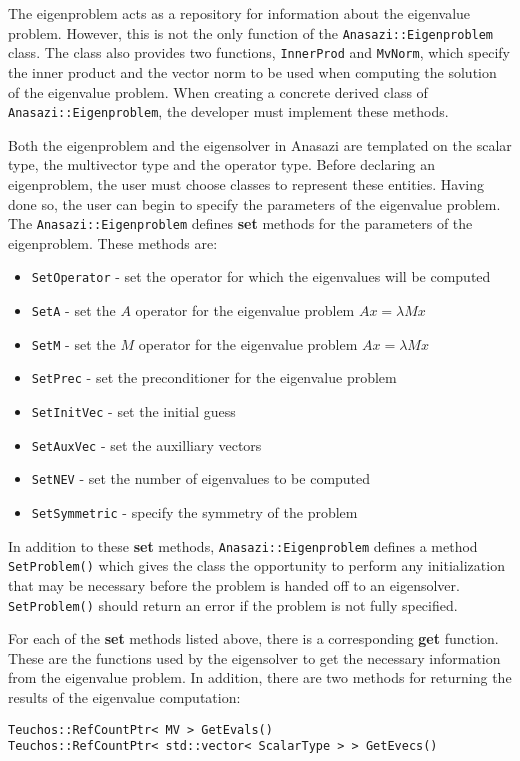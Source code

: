 The eigenproblem acts as a repository for information about the eigenvalue
problem. However, this is not the only function of the
\verb!Anasazi::Eigenproblem! class. The class also provides two functions,
\verb!InnerProd! and \verb!MvNorm!, which specify the inner product and the
vector norm to be used when computing the solution of the eigenvalue problem.
When creating a concrete derived class of \verb!Anasazi::Eigenproblem!, the
developer must implement these methods.

Both the eigenproblem and the eigensolver in Anasazi are templated 
on the scalar type, the multivector type and the operator type. Before
declaring an eigenproblem, the user must choose classes to represent these
entities. Having done so, the user can begin to specify the parameters of the
eigenvalue problem. The \verb!Anasazi::Eigenproblem! defines \textbf{set} methods for
the parameters of the eigenproblem. These methods are:
\begin{itemize}
\item \verb!SetOperator! - set the operator for which the eigenvalues will be computed
\item \verb!SetA! - set the $A$ operator for the eigenvalue problem $Ax=\lambda M x$
\item \verb!SetM! - set the $M$ operator for the eigenvalue problem $Ax=\lambda M x$
\item \verb!SetPrec! - set the preconditioner for the eigenvalue problem
\item \verb!SetInitVec! - set the initial guess
\item \verb!SetAuxVec! - set the auxilliary vectors
\item \verb!SetNEV! - set the number of eigenvalues to be computed
\item \verb!SetSymmetric! - specify the symmetry of the problem
\end{itemize}
In addition to these \textbf{set} methods, \verb!Anasazi::Eigenproblem! defines
a method \verb!SetProblem()! which gives the class the opportunity to perform
any initialization that may be necessary before the problem is handed off to an
eigensolver. \verb!SetProblem()! should return an error if the problem is not
fully specified.

For each of the \textbf{set} methods listed above, there is a corresponding
\textbf{get} function. These are the functions used by the eigensolver to get
the necessary information from the eigenvalue problem. In addition, there are
two methods for returning the results of the eigenvalue computation:
\begin{verbatim}
Teuchos::RefCountPtr< MV > GetEvals()
Teuchos::RefCountPtr< std::vector< ScalarType > > GetEvecs()
\end{verbatim}


